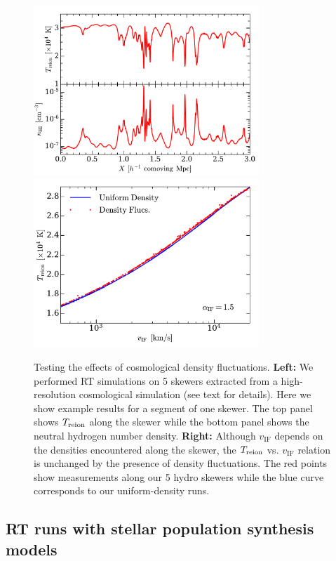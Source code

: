 \documentclass[twocolumn]{aastex62}
\newcommand{\Treion}{T_{\rm reion}}
\newcommand{\vIF}{v_{\mathrm{IF}}}
\begin{document}
\begin{appendix}
\begin{figure}
\includegraphics[width=8.5cm]{fig14a.pdf}
\includegraphics[width=8.5cm]{fig14b.pdf}
\caption{ {Testing the effects of cosmological density fluctuations.  {\bf Left:} We performed RT simulations on 5 skewers extracted from a high-resolution cosmological simulation (see text for details).  Here we show example results for a segment of one skewer.  The top panel shows $\Treion$ along the skewer while the bottom panel shows the neutral hydrogen number density.  {\bf Right:} Although $\vIF$ depends on the densities encountered along the skewer, the $\Treion$ vs. $\vIF$ relation is unchanged by the presence of density fluctuations.  The red points show measurements along our 5 hydro skewers while the blue curve corresponds to our uniform-density runs.   } }
\label{fig:hydro_skewers}
\end{figure}     

\subsection{RT runs with stellar population synthesis models}


\end{appendix}
\end{document}
